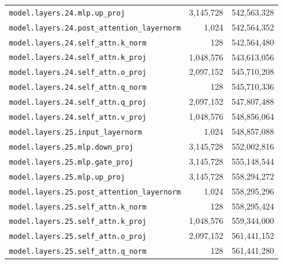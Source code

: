 \documentclass[10pt,a4paper]{article}
\theoremstyle{definition}
\begin{document}
\begin{appendices}
\begin{longtable}{p{9.5cm}rr}
\texttt{model.\allowbreak{}layers.\allowbreak{}24.\allowbreak{}mlp.\allowbreak{}up\_proj} & 3,145,728 & 542,563,328 \\
\texttt{model.\allowbreak{}layers.\allowbreak{}24.\allowbreak{}post\_attention\_layernorm} & 1,024 & 542,564,352 \\
\texttt{model.\allowbreak{}layers.\allowbreak{}24.\allowbreak{}self\_attn.\allowbreak{}k\_norm} & 128 & 542,564,480 \\
\texttt{model.\allowbreak{}layers.\allowbreak{}24.\allowbreak{}self\_attn.\allowbreak{}k\_proj} & 1,048,576 & 543,613,056 \\
\texttt{model.\allowbreak{}layers.\allowbreak{}24.\allowbreak{}self\_attn.\allowbreak{}o\_proj} & 2,097,152 & 545,710,208 \\
\texttt{model.\allowbreak{}layers.\allowbreak{}24.\allowbreak{}self\_attn.\allowbreak{}q\_norm} & 128 & 545,710,336 \\
\texttt{model.\allowbreak{}layers.\allowbreak{}24.\allowbreak{}self\_attn.\allowbreak{}q\_proj} & 2,097,152 & 547,807,488 \\
\texttt{model.\allowbreak{}layers.\allowbreak{}24.\allowbreak{}self\_attn.\allowbreak{}v\_proj} & 1,048,576 & 548,856,064 \\
\texttt{model.\allowbreak{}layers.\allowbreak{}25.\allowbreak{}input\_layernorm} & 1,024 & 548,857,088 \\
\texttt{model.\allowbreak{}layers.\allowbreak{}25.\allowbreak{}mlp.\allowbreak{}down\_proj} & 3,145,728 & 552,002,816 \\
\texttt{model.\allowbreak{}layers.\allowbreak{}25.\allowbreak{}mlp.\allowbreak{}gate\_proj} & 3,145,728 & 555,148,544 \\
\texttt{model.\allowbreak{}layers.\allowbreak{}25.\allowbreak{}mlp.\allowbreak{}up\_proj} & 3,145,728 & 558,294,272 \\
\texttt{model.\allowbreak{}layers.\allowbreak{}25.\allowbreak{}post\_attention\_layernorm} & 1,024 & 558,295,296 \\
\texttt{model.\allowbreak{}layers.\allowbreak{}25.\allowbreak{}self\_attn.\allowbreak{}k\_norm} & 128 & 558,295,424 \\
\texttt{model.\allowbreak{}layers.\allowbreak{}25.\allowbreak{}self\_attn.\allowbreak{}k\_proj} & 1,048,576 & 559,344,000 \\
\texttt{model.\allowbreak{}layers.\allowbreak{}25.\allowbreak{}self\_attn.\allowbreak{}o\_proj} & 2,097,152 & 561,441,152 \\
\texttt{model.\allowbreak{}layers.\allowbreak{}25.\allowbreak{}self\_attn.\allowbreak{}q\_norm} & 128 & 561,441,280 \\

\end{longtable}
\end{appendices}
\end{document}
